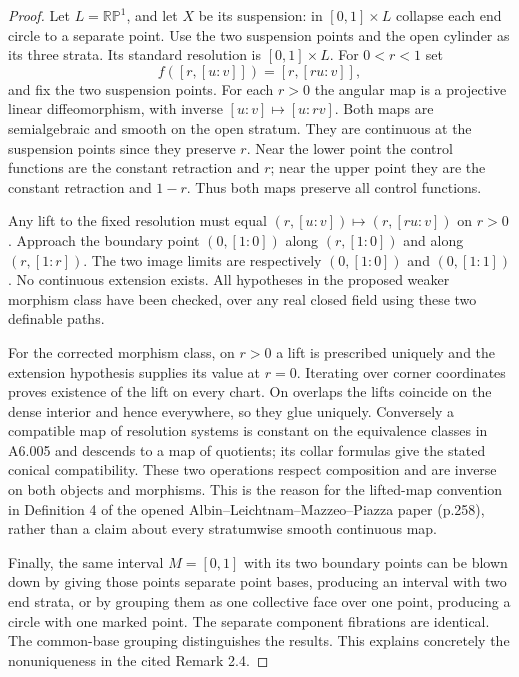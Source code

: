 \begin{proof}
Let $L=\mathbb{RP}^1$, and let $X$ be its suspension: in
$[0,1]\times L$ collapse each end circle to a separate point.
Use the two suspension points and the open cylinder as its three
strata. Its standard resolution is $[0,1]\times L$. For $0<r<1$ set
\[
 f([r,[u:v]])=[r,[ru:v]],
\]
and fix the two suspension points. For each $r>0$ the angular map is a projective linear
diffeomorphism, with inverse $[u:v]\mapsto[u:rv]$.
Both maps are semialgebraic and smooth on the open stratum.
They are continuous at the suspension points since they preserve
$r$. Near the lower point the control functions are the constant
retraction and $r$; near the upper point they are the constant
retraction and $1-r$. Thus both maps preserve all control functions.

Any lift to the fixed resolution must equal $(r,[u:v])\mapsto
(r,[ru:v])$ on $r>0$. Approach the boundary point $(0,[1:0])$
along $(r,[1:0])$ and along $(r,[1:r])$. The two image limits
are respectively $(0,[1:0])$ and $(0,[1:1])$. No continuous
extension exists. All hypotheses in the proposed weaker
morphism class have been checked, over any real closed field
using these two definable paths.

For the corrected morphism class, on $r>0$ a lift is prescribed
uniquely and the extension hypothesis supplies its value at
$r=0$. Iterating over corner coordinates proves existence of
the lift on every chart. On overlaps the lifts coincide on the
dense interior and hence everywhere, so they glue uniquely.
Conversely a compatible map of resolution systems is constant
on the equivalence classes in A6.005 and descends to a map of
quotients; its collar formulas give the stated conical
compatibility. These two operations respect composition and
are inverse on both objects and morphisms. This is the reason
for the lifted-map convention in Definition 4 of the opened
Albin--Leichtnam--Mazzeo--Piazza paper (p.258), rather than a
claim about every stratumwise smooth continuous map.

Finally, the same interval $M=[0,1]$ with its two boundary
points can be blown down by giving those points separate
point bases, producing an interval with two end strata, or
by grouping them as one collective face over one point,
producing a circle with one marked point. The separate
component fibrations are identical. The common-base grouping
distinguishes the results. This explains concretely the
nonuniqueness in the cited Remark 2.4.
\end{proof}

